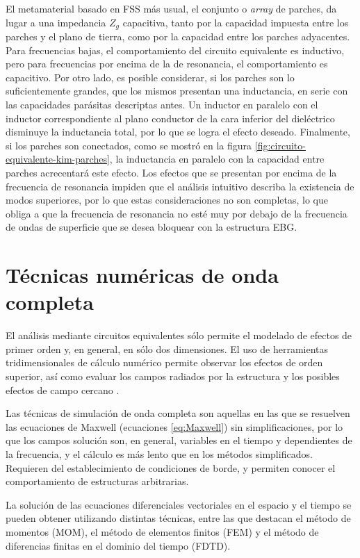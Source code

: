 El metamaterial basado en FSS más usual, el conjunto o \textit{array} de parches, da lugar a una impedancia $Z_g$ capacitiva, tanto por la capacidad impuesta entre los parches y el plano de tierra, como por la capacidad entre los parches adyacentes. Para frecuencias bajas, el comportamiento del circuito equivalente es inductivo, pero para frecuencias por encima de la de resonancia, el comportamiento es capacitivo. Por otro lado, es posible considerar, si los parches son lo suficientemente grandes, que los mismos presentan una inductancia, en serie con las capacidades parásitas descriptas antes. Un inductor en paralelo con el inductor correspondiente al plano conductor de la cara inferior del dieléctrico disminuye la inductancia total, por lo que se logra el efecto deseado. Finalmente, si los parches son conectados, como se mostró en la figura \ref{fig:circuito-equivalente-kim-parches}, la inductancia en paralelo con la capacidad entre parches acrecentará este efecto. Los efectos que se presentan por encima de la frecuencia de resonancia impiden que el análisis intuitivo describa la existencia de modos superiores, por lo que estas consideraciones no son completas, lo que obliga a que la frecuencia de resonancia no esté muy por debajo de la frecuencia de ondas de superficie que se desea bloquear con la estructura EBG.

\section{Técnicas numéricas de onda completa}
\label{sec_estructuras_periodicas}

El análisis mediante circuitos equivalentes sólo permite el modelado de efectos de primer orden y, en general, en sólo dos dimensiones. El uso de herramientas tridimensionales de cálculo numérico permite observar los efectos de orden superior, así como evaluar los campos radiados por la estructura y los posibles efectos de campo cercano \cite{Mohajer:SupressionBand}.

Las técnicas de simulación de onda completa son aquellas en las que se resuelven las ecuaciones de Maxwell (ecuaciones \ref{eq:Maxwell}) sin simplificaciones, por lo que los campos solución son, en general, variables en el tiempo y dependientes de la frecuencia, y el cálculo es más lento que en los métodos simplificados. Requieren del establecimiento de condiciones de borde, y permiten conocer el comportamiento de estructuras arbitrarias.

La solución de las ecuaciones diferenciales vectoriales en el espacio y el tiempo se pueden obtener utilizando distintas técnicas, entre las que destacan el método de momentos (MOM), el método de elementos finitos (FEM) y el método de diferencias finitas en el dominio del tiempo (FDTD).

